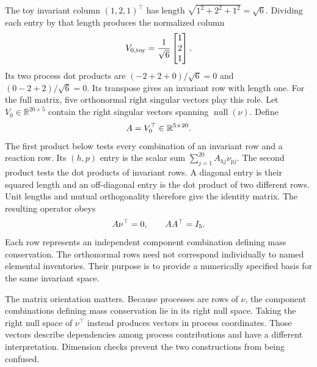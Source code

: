 The toy invariant column $(1,2,1)^\top$ has length $\sqrt{1^2+2^2+1^2}=\sqrt6$. Dividing each entry by that length produces the normalized column
\[
V_{0,\rm toy}=\frac1{\sqrt6}\begin{bmatrix}1\\2\\1\end{bmatrix}.
\]
Its two process dot products are $(-2+2+0)/\sqrt6=0$ and $(0-2+2)/\sqrt6=0$. Its transpose gives an invariant row with length one. For the full matrix, five orthonormal right singular vectors play this role. Let $V_0\in\mathbb{R}^{20\times5}$ contain the right singular vectors spanning $\operatorname{null}(\nu)$. Define
\begin{equation}
\equationname{Orthonormal mass conservation operator from the null space}
A=V_0^\top\in\mathbb{R}^{5\times20}.
\label{eq:invariant_basis_definition}
\end{equation}
The first product below tests every combination of an invariant row and a reaction row. Its $(h,p)$ entry is the scalar sum $\sum_{j=1}^{20}A_{hj}\nu_{pj}$. The second product tests the dot products of invariant rows. A diagonal entry is their squared length and an off-diagonal entry is the dot product of two different rows. Unit lengths and mutual orthogonality therefore give the identity matrix. The resulting operator obeys
\begin{equation}
\equationname{Null-space and orthonormality identities of the invariant operator}
A\nu^\top=0,\qquad AA^\top=I_5.
\label{eq:invariant_basis_properties}
\end{equation}
Each row represents an independent component combination defining mass conservation. The orthonormal rows need not correspond individually to named elemental inventories. Their purpose is to provide a numerically specified basis for the same invariant space.

The matrix orientation matters. Because processes are rows of $\nu$, the component combinations defining mass conservation lie in its right null space. Taking the right null space of $\nu^\top$ instead produces vectors in process coordinates. Those vectors describe dependencies among process contributions and have a different interpretation. Dimension checks prevent the two constructions from being confused.

